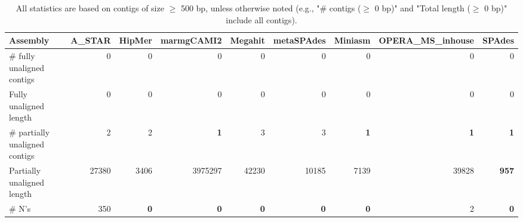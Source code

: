 \documentclass[12pt,a4paper]{article}
\begin{document}
\begin{table}[ht]
\begin{center}
\caption{All statistics are based on contigs of size $\geq$ 500 bp, unless otherwise noted (e.g., "\# contigs ($\geq$ 0 bp)" and "Total length ($\geq$ 0 bp)" include all contigs).}
\begin{tabular}{|l*{8}{|r}|}
\hline
Assembly & A\_STAR & HipMer & marmgCAMI2 & Megahit & metaSPAdes & Miniasm & OPERA\_MS\_inhouse & SPAdes \\ \hline
\# fully unaligned contigs & 0 & 0 & 0 & 0 & 0 & 0 & 0 & 0 \\ \hline
Fully unaligned length & 0 & 0 & 0 & 0 & 0 & 0 & 0 & 0 \\ \hline
\# partially unaligned contigs & 2 & 2 & {\bf 1} & 3 & 3 & {\bf 1} & {\bf 1} & {\bf 1} \\ \hline
Partially unaligned length & 27380 & 3406 & 3975297 & 42230 & 10185 & 7139 & 39828 & {\bf 957} \\ \hline
\# N's & 350 & {\bf 0} & {\bf 0} & {\bf 0} & {\bf 0} & {\bf 0} & 2 & {\bf 0} \\ \hline
\end{tabular}
\end{center}
\end{table}
\end{document}
